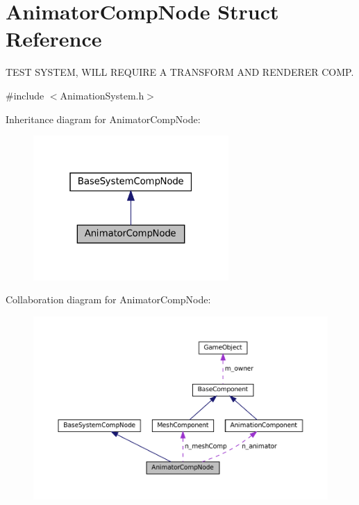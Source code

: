 \hypertarget{structAnimatorCompNode}{}\section{Animator\+Comp\+Node Struct Reference}
\label{structAnimatorCompNode}


T\+E\+ST S\+Y\+S\+T\+EM, W\+I\+LL R\+E\+Q\+U\+I\+RE A T\+R\+A\+N\+S\+F\+O\+RM A\+ND R\+E\+N\+D\+E\+R\+ER C\+O\+MP.  




{\ttfamily \#include $<$Animation\+System.\+h$>$}



Inheritance diagram for Animator\+Comp\+Node\+:\nopagebreak
\begin{figure}[H]
\begin{center}
\leavevmode
\includegraphics[width=211pt]{structAnimatorCompNode__inherit__graph}
\end{center}
\end{figure}


Collaboration diagram for Animator\+Comp\+Node\+:\nopagebreak
\begin{figure}[H]
\begin{center}
\leavevmode
\includegraphics[width=350pt]{structAnimatorCompNode__coll__graph}
\end{center}
\end{figure}
